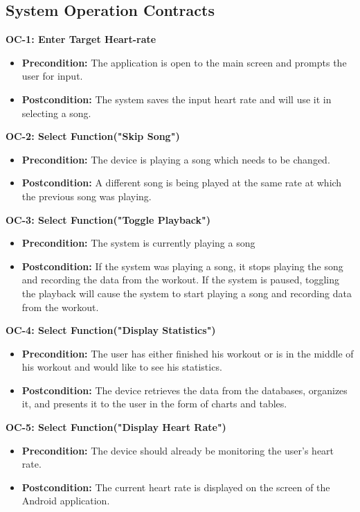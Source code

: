 \documentclass[letterpaper,english, 12pt]{scrreprt}
\begin{document}
\subsection{System Operation Contracts}
{\bf OC-1: Enter Target Heart-rate}
\begin{itemize}
        \item {\bf Precondition: } The application is open to the main screen and prompts the user for input.
        \item {\bf Postcondition: } The system saves the input heart rate and will use it in selecting a song.
\end{itemize}

{\bf OC-2: Select Function("Skip Song")}
\begin{itemize}
        \item {\bf Precondition: } The device is playing a song which needs to be changed.
        \item {\bf Postcondition: } A different song is being played at the same rate at which the previous song was playing.

\end{itemize}

{\bf OC-3: Select Function("Toggle Playback")}
\begin{itemize}
        \item {\bf Precondition: } The system is currently playing a song
        \item {\bf Postcondition: } If the system was playing a song, it stops playing the song and recording the data from the workout. If the system is paused, toggling the playback will cause the system to start playing a song and recording data from the workout.

\end{itemize}

{\bf OC-4: Select Function("Display Statistics")}
\begin{itemize}
        \item {\bf Precondition: } The user has either finished his workout or is in the middle of his workout and would like to see his statistics.
        \item {\bf Postcondition: } The device retrieves the data from the databases, organizes it, and presents it to the user in the form of charts and tables.
\end{itemize}

{\bf OC-5: Select Function("Display Heart Rate")}
\begin{itemize}
        \item {\bf Precondition: } The device should already be monitoring the user's heart rate.
        \item {\bf Postcondition: } The current heart rate is displayed on the screen of the Android application.
\end{itemize}
\end{document}

